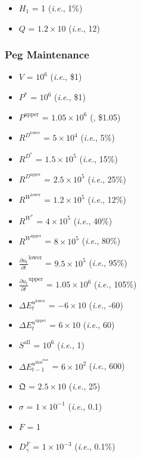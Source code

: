 \documentclass[class=article, crop=false]{standalone}
\begin{document}
\begin{itemize}[topsep=0pt, itemsep=3pt,leftmargin=16pt]
    \item $H_{1}$ = 1 (\textit{i.e.}, 1\%)
    \item $Q$ = $1.2 \times 10$ (\textit{i.e.}, 12)
\end{itemize}


\subsubsection{Peg Maintenance}

\begin{itemize}[topsep=0pt, itemsep=3pt,leftmargin=16pt]
    \item $V$ = $10^{6}$ (\textit{i.e.}, \$1)
    \item $P^{*}$ = $10^{6}$ (\textit{i.e.}, \$1)
    \item $P^{\text{upper}}$ = $1.05 \times 10^{6}$ (, \$1.05)
    \item $R^{D^{\text{lower}}}$ = $5 \times 10^{4}$ (\textit{i.e.}, 5\%)
    \item $R^{D^{*}}$ = $1.5 \times 10^{5}$ (\textit{i.e.}, 15\%)
    \item $R^{D^{\text{upper}}}$ = $2.5 \times 10^{5}$ (\textit{i.e.}, 25\%)
    \item $R^{W^{\text{lower}}}$ = $1.2 \times 10^{5}$ (\textit{i.e.}, 12\%)
    \item $R^{W^{*}}$ = $4 \times 10^{5}$ (\textit{i.e.}, 40\%)
    \item $R^{W^{\text{upper}}}$ = $8 \times 10^{5}$ (\textit{i.e.}, 80\%)
    \item $\frac{\partial u_{t}}{\partial t}^{\text{lower}}$ = $9.5 \times 10^{5}$ (\textit{i.e.}, 95\%)
    \item $\frac{\partial u_{t}}{\partial t}^{\text{upper}}$ = $1.05 \times 10^{6}$ (\textit{i.e.}, 105\%)
    \item $\Delta E_{t}^{u^{\text{lower}}}$ = $-6 \times 10$ (\textit{i.e.}, -60)
    \item $\Delta E_{t}^{u^{\text{upper}}}$ = $6 \times 10$ (\textit{i.e.}, 60)
    \item $S^{\text{all}}$ = $10^{6}$ (\textit{i.e.}, 1)
    \item $\Delta E_{t-1}^{u^{\text{first}^{\text{max}}}}$ = $6 \times 10^{2}$ (\textit{i.e.}, 600)
    \item $\mathfrak{Q}$ = $2.5 \times 10$ (\textit{i.e.}, 25)
    \item $\sigma$ = $1 \times 10^{-1}$ (\textit{i.e.}, 0.1)
    \item $F$ = 1
    \item $D_{\gamma}^{F}$ = $1 \times 10^{-3}$ (\textit{i.e.}, 0.1\%)
\end{itemize}
\end{document}
